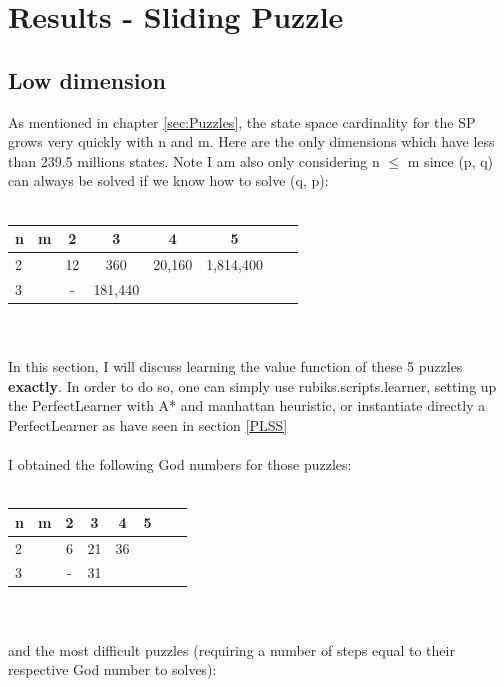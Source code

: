 
\chapter{Results - Sliding Puzzle} %

\label{sec:ResultsSP} %


\section{Low dimension}

As mentioned in chapter \ref{sec:Puzzles}, the state space cardinality for the SP grows very quickly with n and m. Here are the only dimensions which have less than 239.5 millions states. Note I am also only considering n $\leq$ m since (p, q) can always be solved if we know how to solve (q, p):
\\
\\
\begin{tabular}{l*{6}{c}r}
n              & m & 2 & 3 & 4 & 5\\
\hline
2              &   & 12 & 360 & 20,160 & 1,814,400 \\
3              &   & - & 181,440 &  &    \\
\end{tabular}
\\
\\
In this section, I will discuss learning the value function of these 5 puzzles \textbf{exactly}.
In order to do so, one can simply use rubiks.scripts.learner, setting up the PerfectLearner with A* and manhattan heuristic, or instantiate directly a PerfectLearner as have seen in section \ref{PLSS}
\\
\\
I obtained the following God numbers for those puzzles:
\\
\\
\begin{tabular}{l*{6}{c}r}
n              & m & 2 & 3 & 4 & 5\\
\hline
2              &   & 6 & 21 & 36 &  \\
3              &   & - & 31 &  &    \\
\end{tabular}
\\
\\
and the most difficult puzzles (requiring a number of steps equal to their respective God number to solves):


